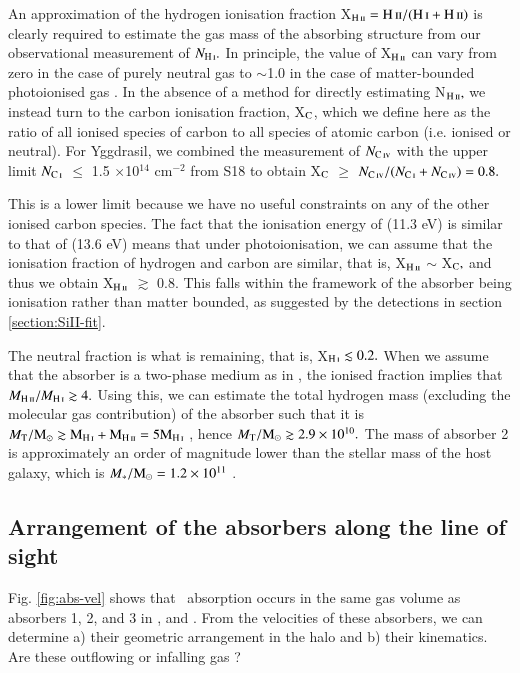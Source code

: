 An approximation of the hydrogen ionisation fraction X$_\ion{H}{II} = \ion{H}{II}/(\ion{H}{I}+\ion{H}{II})$ is clearly required to estimate the gas mass of the absorbing structure from our observational measurement of $N_\ion{H}{I}.$ In principle, the value of X$_\ion{H}{II}$ can vary from zero in the case of purely neutral gas to $\sim$1.0 in the case of matter-bounded photoionised gas \citep[e.g.][]{binette1996,wilson1997}. In the absence of a method for directly estimating N$_\ion{H}{II},$ we instead turn to the carbon ionisation fraction, X$_{\rm C}$, which we define here as the ratio of all ionised species of carbon to all species of atomic carbon (i.e. ionised or neutral). For Yggdrasil, we combined the measurement of $N_\ion{C}{IV}$ with the upper limit $N_\ion{C}{I}$ $\le$ 1.5 $\times$10$^{14}$ cm$^{-2}$ from S18 to obtain X$_{\rm C}$ $\ge$ $N_\ion{C}{IV} / (N_\ion{C}{I}+N_\ion{C}{IV}) = 0.8.$ 

This is a lower limit because we have no useful constraints on any of the other ionised carbon species. The fact that the ionisation energy of  (11.3 eV) is similar to that of  (13.6 eV) means that under photoionisation, we can assume that the ionisation fraction of hydrogen and carbon are similar, that is, X$_\ion{H}{II}$ $\sim$ X$_{\rm C},$ and thus we obtain X$_\ion{H}{II}$ $\gtrsim$ 0.8. This falls within the framework of the absorber being ionisation rather than matter bounded, as suggested by the  detections in section \ref{section:SiII-fit}.  

The neutral fraction is what is remaining, that is, X$_\ion{H}{I} \lesssim 0.2.$ When we assume that the absorber is a two-phase medium as in \citet{binette2000}, the ionised fraction implies that $M_\ion{H}{II}/M_\ion{H}{I} \gtrsim 4.$ Using this, we can estimate the total hydrogen mass (excluding the molecular gas contribution) of the absorber such that it is $M_{\rm T}/\rm{M}_\odot \gtrsim M_\ion{H}{I} + M_\ion{H}{II} = 5 M_\ion{H}{I}$ , hence $M_{\rm T}/\rm{M}_\odot \gtrsim 2.9\times 10^{10}.$ The mass of absorber 2 is approximately an order of magnitude lower than the stellar mass of the host galaxy, which is $M_*/\rm{M}_\odot = 1.2\times 10^{11}$ \citep{seymour2007}. 

\subsection{Arrangement of the absorbers along the line of sight}\label{section:arrangement-absorbers}

Fig. \ref{fig:abs-vel} shows that \lya~absorption occurs in the same gas volume as absorbers 1, 2, and 3 in ,  and . From the velocities of these absorbers, we can determine a) their geometric arrangement in the halo and b) their kinematics. Are these outflowing \citep[e.g.][]{zirm2005,nesvadba2006} or infalling gas \citep[e.g.][]{BarkanaLoeb2003,humphrey2008b}?

